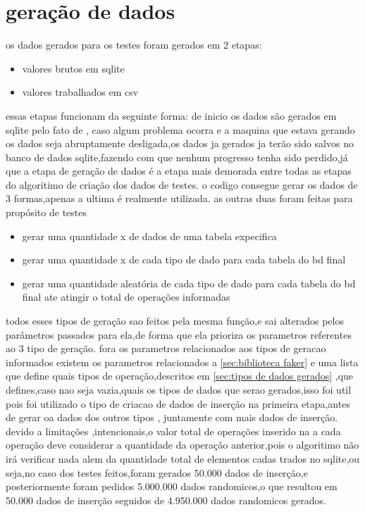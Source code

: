 \documentclass[
	12pt,				%
	openright,			%
	oneside,			%
	a4paper,			%
	english,			%
	french,				%
	spanish,			%
	brazil,				%
	]{abntex2}
\begin{document}
\section{geração de dados}
\label{sec:geração de dados}
os dados gerados para os testes foram gerados em 2 etapas:
\begin{itemize}
\item valores brutos em sqlite
\item valores trabalhados em csv
\end{itemize}
essas etapas funcionam da seguinte forma:\newline
de inicio os dados são gerados em sqlite pelo fato de , caso algum problema ocorra e a maquina que estava gerando os dados seja abruptamente desligada,os dados ja gerados ja terão sido salvos no banco de dados sqlite,fazendo com que nenhum progresso tenha sido perdido,já que a etapa de geração de dados é a etapa mais demorada entre todas as etapas do algoritimo de criação dos dados de testes.\newline
o codigo consegue gerar os dados de 3 formas,apenas a ultima é realmente utilizada.
as outras duas foram feitas para propósito de testes
\begin{itemize}
\item gerar uma quantidade x de dados de uma tabela expecifica
\item gerar uma quantidade x de cada tipo de dado para cada tabela do bd final
\item gerar uma quantidade aleatória de cada tipo de dado para cada tabela do bd final ate atingir o total de operações informadas
\end{itemize}

todos esses tipos de geração sao feitos pela mesma função,e sai alterados pelos parâmetros passados para ela,de forma que ela prioriza os parametros referentes ao 3 tipo de geração.\newline
fora os parametros relacionados aos tipos de geracao informados existem os parametros relacionados a \autoref{sec:biblioteca faker} e uma lista que define quais tipos de operação,descritos em \autoref{sec:tipos de dados gerados} ,que defines,caso nao seja vazia,quais os tipos de dados que serao gerados,isso foi util pois foi utilizado o tipo de criacao de dados de inserção na primeira etapa,antes de gerar oa dados dos outros tipos , juntamente com mais dados de inserção.\newline
devido a limitações ,intencionais,o valor total de operações inserido na a cada operação deve considerar a quantidade da operação anterior,pois o algoritimo não irá verificar nada alem da quantidade total de elementos cadas trados no sqlite,ou seja,no caso dos testes feitos,foram gerados 50.000 dados de inserção,e posteriormente foram pedidos 5.000.000 dados randomicos,o que resultou em 50.000 dados de inserção seguidos de 4.950.000 dados randomicos gerados.
\end{document}
